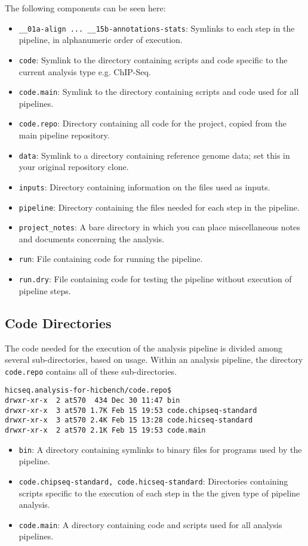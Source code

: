 The following components can be seen here:
\begin{itemize}
\item \texttt{\_\_01a-align ... \_\_15b-annotations-stats}: Symlinks to each step in the pipeline, in alphanumeric order of execution.
\item \texttt{code}: Symlink to the directory containing scripts and code specific to the current analysis type e.g. ChIP-Seq.
\item \texttt{code.main}: Symlink to the directory containing scripts and code used for all pipelines.
\item \texttt{code.repo}: Directory containing all code for the project, copied from the main pipeline repository. 
\item \texttt{data}: Symlink to a directory containing reference genome data; set this in your original repository clone. 
\item \texttt{inputs}: Directory containing information on the files used as inputs.
\item \texttt{pipeline}: Directory containing the files needed for each step in the pipeline.
\item \texttt{project\_notes}: A bare directory in which you can place miscellaneous notes and documents concerning the analysis.
\item \texttt{run}: File containing code for running the pipeline. 
\item \texttt{run.dry}: File containing code for testing the pipeline without execution of pipeline steps. 
\end{itemize}

\subsection{Code Directories}
The code needed for the execution of the analysis pipeline is divided among several sub-directories, based on usage. Within an analysis pipeline, the directory \texttt{code.repo} contains all of these sub-directories.

\begin{lstlisting}
hicseq.analysis-for-hicbench/code.repo$
drwxr-xr-x  2 at570  434 Dec 30 11:47 bin
drwxr-xr-x  3 at570 1.7K Feb 15 19:53 code.chipseq-standard
drwxr-xr-x  3 at570 2.4K Feb 15 13:28 code.hicseq-standard
drwxr-xr-x  2 at570 2.1K Feb 15 19:53 code.main
\end{lstlisting}

\begin{itemize}
\item \texttt{bin}: A directory containing symlinks to binary files for programs used by the pipeline. %
\item \texttt{code.chipseq-standard, code.hicseq-standard}: Directories containing scripts specific to the execution of each step in the the given type of pipeline analysis.
\item \texttt{code.main}: A directory containing code and scripts used for all analysis pipelines. 
\end{itemize}
